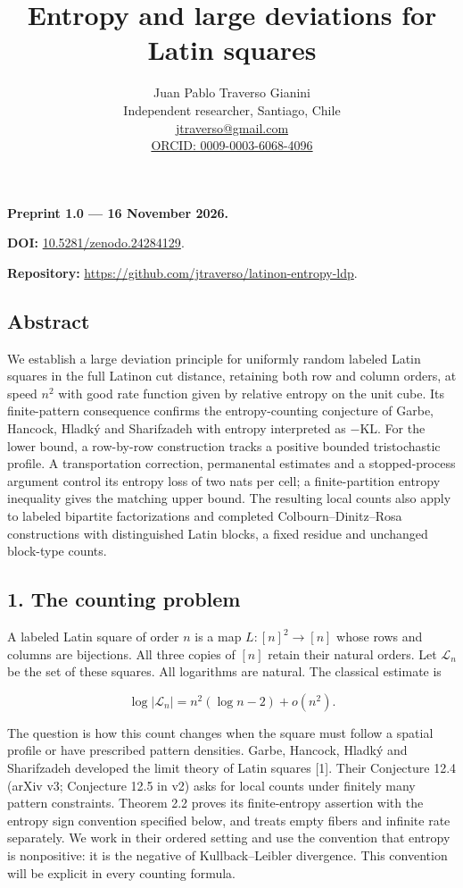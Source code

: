 \documentclass[english,11pt,a4paper]{article}
\title{Entropy and large deviations for Latin squares}
\author{Juan Pablo Traverso Gianini\\\small Independent researcher, Santiago, Chile\\\small \href{mailto:jtraverso@gmail.com}{jtraverso@gmail.com}\\\small \href{https://orcid.org/0009-0003-6068-4096}{ORCID: 0009-0003-6068-4096}}
\date{}
\begin{document}
\raggedbottom\maketitle
\textbf{Preprint 1.0 --- 16 November 2026.}

\textbf{DOI:} \href{https://doi.org/10.5281/zenodo.24284129}{10.5281/zenodo.24284129}.

\textbf{Repository:} \url{https://github.com/jtraverso/latinon-entropy-ldp}.

\subsection{Abstract}\label{abstract}

We establish a large deviation principle for uniformly random labeled Latin squares in the full Latinon cut distance, retaining both row and column orders, at speed \(n^2\) with good rate function given by relative entropy on the unit cube. Its finite-pattern consequence confirms the entropy-counting conjecture of Garbe, Hancock, Hladký and Sharifzadeh with entropy interpreted as \(-\mathrm{KL}\). For the lower bound, a row-by-row construction tracks a positive bounded tristochastic profile. A transportation correction, permanental estimates and a stopped-process argument control its entropy loss of two nats per cell; a finite-partition entropy inequality gives the matching upper bound. The resulting local counts also apply to labeled bipartite factorizations and completed Colbourn--Dinitz--Rosa constructions with distinguished Latin blocks, a fixed residue and unchanged block-type counts.

\subsection{1. The counting problem}\label{the-counting-problem}

A labeled Latin square of order \(n\) is a map \(L:[n]^2\to[n]\) whose rows and columns are bijections. All three copies of \([n]\) retain their natural orders. Let \(\mathcal L_n\) be the set of these squares. All logarithms are natural. The classical estimate is

\nopagebreak[4]
\[\log|\mathcal L_n|=n^2(\log n-2)+o(n^2).\tag{1.1}\]

The question is how this count changes when the square must follow a spatial profile or have prescribed pattern densities. Garbe, Hancock, Hladký and Sharifzadeh developed the limit theory of Latin squares {[}1{]}. Their Conjecture 12.4 (arXiv v3; Conjecture 12.5 in v2) asks for local counts under finitely many pattern constraints. Theorem 2.2 proves its finite-entropy assertion with the entropy sign convention specified below, and treats empty fibers and infinite rate separately. We work in their ordered setting and use the convention that entropy is nonpositive: it is the negative of Kullback--Leibler divergence. This convention will be explicit in every counting formula.
\end{document}
